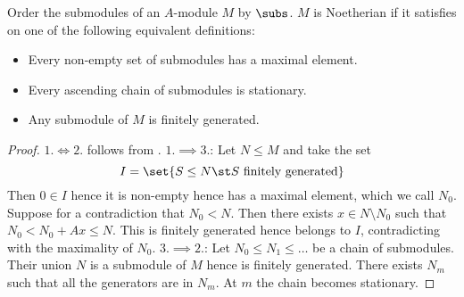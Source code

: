 \begin{dfn}
    Order the submodules of an $A$-module $M$ by $\subs$.
    $M$ is Noetherian if it satisfies on one of the following
    equivalent definitions:
    \begin{itemize}
        \item Every non-empty set of submodules has a maximal element.
        \item Every ascending chain of submodules is stationary.
        \item Any submodule of $M$ is finitely generated.
    \end{itemize}
\end{dfn}
\begin{proof}
    $1. \iff 2.$ follows from .
    $1. \implies 3.$: Let $N \leq M$ and take the set 
    \[I = \set{S \leq N \st S \text{ finitely generated}}\]
    Then $0 \in I$ hence it is non-empty hence has a maximal element,
    which we call $N_0$.
    Suppose for a contradiction that $N_0 < N$. 
    Then there exists $x \in N \setminus N_0$ such that $N_0 < N_0 + Ax \leq N$.
    This is finitely generated hence belongs to $I$, 
    contradicting with the maximality of $N_0$.
    $3. \implies 2.$: Let $N_0 \leq N_1 \leq \dots$ 
    be a chain of submodules.
    Their union $N$ is a submodule of $M$ hence is finitely generated.
    There exists $N_m$ such that all the generators are in $N_m$.
    At $m$ the chain becomes stationary.
\end{proof}

